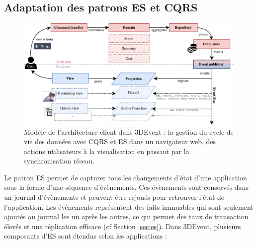 \subsection{Adaptation des patrons \gls{ES} et \gls{CQRS}}

\begin{figure}[ht]
	\centering
	\includegraphics[width=0.9\columnwidth]{eps/cqrs2.pdf}
	\caption[Modèle de l'architecture client dans 3DEvent]{Modèle de l'architecture 
		client dans 3DEvent : la gestion du cycle de vie des données avec 
		\gls{CQRS} 
		et \gls{ES} dans un navigateur web, des actions utilisateurs à la visualisation 
		en passant par la synchronisation réseau.}
	\label{fig:cqrs-client}
\end{figure}

Le patron \gls{ES} permet de capturer tous les changements d'état 
d'une application sous la forme d'une séquence d'évènements. 
Ces évènements sont conservés dans un journal d'évènements et peuvent être 
rejoués pour retrouver l'état de l'application. 
Les évènements représentent des faits immuables qui sont 
seulement ajoutés au journal les un après les autres, ce qui permet des taux de 
transaction élevés et une réplication efficace (cf Section 
\ref{sec:es}). Dans 3DEvent, plusieurs composants d'\gls{ES} sont étendus selon 
les applications :

